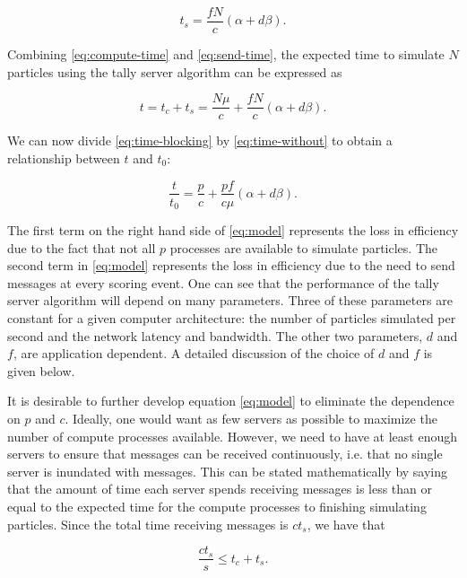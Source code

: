 \begin{equation}
  \label{eq:send-time}
  t_s = \frac{fN}{c} \left ( \alpha + d\beta \right ).
\end{equation}

\noindent Combining \eqref{eq:compute-time} and \eqref{eq:send-time}, the
expected time to simulate $N$ particles using the tally server algorithm can be
expressed as

\begin{equation}
  \label{eq:time-blocking}
  t = t_c + t_s = \frac{N\mu}{c} + \frac{fN}{c} \left ( \alpha + d\beta \right
  ).
\end{equation}

\noindent We can now divide \eqref{eq:time-blocking} by \eqref{eq:time-without}
to obtain a relationship between $t$ and $t_0$:

\begin{equation}
  \label{eq:model}
  \frac{t}{t_0} = \frac{p}{c} + \frac{pf}{c\mu} \left ( \alpha + d\beta
    \right ).
\end{equation}

\noindent The first term on the right hand side of \eqref{eq:model} represents
the loss in efficiency due to the fact that not all $p$ processes are available
to simulate particles. The second term in \eqref{eq:model} represents the loss
in efficiency due to the need to send messages at every scoring event. One can
see that the performance of the tally server algorithm will depend on many
parameters. Three of these parameters are constant for a given computer
architecture: the number of particles simulated per second and the network
latency and bandwidth. The other two parameters, $d$ and $f$, are application
dependent. A detailed discussion of the choice of $d$ and $f$ is given below.

It is desirable to further develop equation \eqref{eq:model} to eliminate the
dependence on $p$ and $c$. Ideally, one would want as few servers as possible to
maximize the number of compute processes available. However, we need to have at
least enough servers to ensure that messages can be received continuously,
i.e. that no single server is inundated with messages. This can be stated
mathematically by saying that the amount of time each server spends receiving
messages is less than or equal to the expected time for the compute processes to
finishing simulating particles. Since the total time receiving messages is
$ct_s$, we have that

\begin{equation}
  \label{eq:constraint-blocking}
  \frac{ct_s}{s} \le t_c + t_s.
\end{equation}

